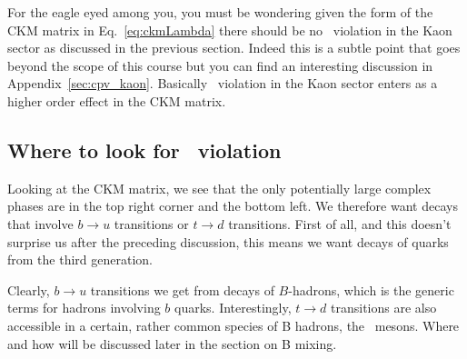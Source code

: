 For the eagle eyed among you, you must be wondering given the form of
the CKM matrix in Eq.~\ref{eq:ckmLambda} there should be no
\cp\ violation in the Kaon sector as discussed in the previous
section. Indeed this is a subtle point that goes beyond the scope of
this course but you can find an interesting discussion in 
Appendix~\ref{sec:cpv_kaon}.  Basically \cp\ violation in
the Kaon sector enters as a higher order effect in the CKM matrix.

\subsection{Where to look for \cp\ violation}
 Looking at the CKM matrix, we see that the only potentially large
 complex phases are in the top right corner and the bottom left. We
 therefore want decays that involve $b\to u$ transitions or $t\to d$
 transitions. First of all, and this doesn't surprise us after the
 preceding discussion, this means we want decays of quarks from the
 third generation.

 Clearly, $b \to u$ transitions we get from decays of $B$-hadrons,
 which is the generic terms for hadrons involving $b$
 quarks. Interestingly, $t \to d$ transitions are also accessible in a
 certain, rather common species of B hadrons, the \Bdo\ mesons. Where
 and how will be discussed later in the section on B mixing.


